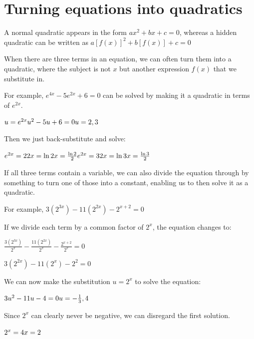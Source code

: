 \documentclass[../main.tex]{subfiles}
\begin{document}
\section{Turning equations into quadratics}
A normal quadratic appears in the form $ax^2+bx+c=0$, whereas a hidden quadratic can be written as $a[f(x)]^2+b[f(x)]+c=0$

When there are three terms in an equation, we can often turn them into a quadratic, where the subject is not \(x\) but another expression $f(x)$ that we substitute in.

For example, \(e^{4x}-5e^{2x}+6=0\) can be solved by making it a quadratic in terms of \(e^{2x}\).

\(u=e^{2x}\\
u^2-5u+6=0\\
u=2, 3\)

Then we just back-substitute and solve:

\(
e^{2x}=2     \\      
2x=\ln{2}      \\ 
x=\frac{\ln{2}}{2}\\     
e^{2x}=3\\
2x=\ln{3}\\
x=\frac{\ln{3}}{2}
\)

If all three terms contain a variable, we can also divide the equation through by something to turn one of those into a constant, enabling us to then solve it as a quadratic.

For example, \(3(2^{3x})-11(2^{2x})-2^{x+2}=0\)

If we divide each term by a common factor of \(2^x\), the equation changes to:

\(\frac{3(2^{3x})}{2^x}-\frac{11(2^{2x})}{2^x}-\frac{2^{x+2}}{2^x}=0\)

\(3(2^{2x})-11(2^x)-2^2=0\)

We can now make the substitution \(u=2^x\) to solve the equation:

\(3u^2-11u-4=0\\
u=-\frac{1}{3}, 4\)

Since \(2^x\) can clearly never be negative, we can disregard the first solution.

\(2^x=4\\
x=2\)\\

\pagebreak
\end{document}
